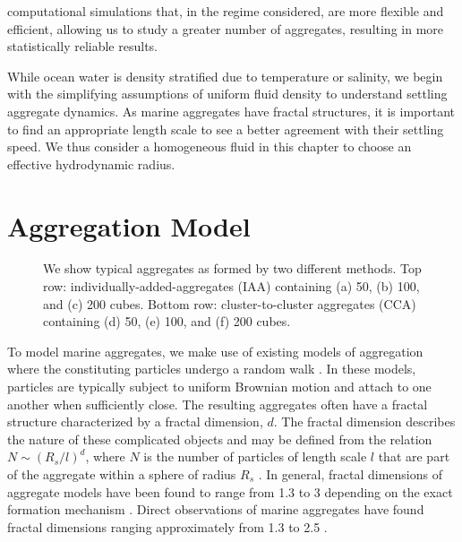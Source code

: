 computational simulations that, in the regime considered, are more flexible and efficient, allowing us to study a greater number of aggregates, resulting in more statistically reliable results. 
\par
While ocean water is density stratified due to temperature or salinity, we begin with the simplifying assumptions of uniform fluid density to understand settling aggregate dynamics. 
As marine aggregates have fractal structures, it is important to find an appropriate length scale to see a better agreement with their settling speed. We thus consider a homogeneous fluid in this chapter to choose an effective hydrodynamic radius. 



\section{Aggregation Model}
\label{sec_model}

\begin{figure}[ht]
\begin{center}
\end{center}
\caption{We show typical aggregates as formed by two different methods. Top row: individually-added-aggregates (IAA) containing (a) 50, (b) 100, and (c) 200 cubes. Bottom row: cluster-to-cluster aggregates (CCA) containing (d) 50, (e) 100, and (f) 200 cubes.}
\label{fig_rad_mass}
\end{figure}

To model marine aggregates, we make use of existing models of aggregation where the constituting particles undergo a random walk
\cite{rosenstock_cluster_1980, witten_diffusion-limited_1981,witten_tenuous_1986,kolb_anisotropic_1987}. 
In these models, particles are typically subject to uniform Brownian motion and attach to one another when 
sufficiently close. The resulting aggregates often have a fractal structure characterized by a fractal dimension, $d$. The fractal dimension describes the nature of these complicated objects and may be defined from the relation $N\sim(R_s/l)^d$, where $N$ is the number of particles of length scale $l$ that are part of the aggregate within a sphere of radius $R_s$ \cite{witten_tenuous_1986}. In general, fractal dimensions of aggregate models have been found to range from 1.3 to 3 depending on the exact formation 
mechanism \cite{witten_diffusion-limited_1981, kolb_anisotropic_1987,gmachowski_calculation_2002}. 
Direct observations of marine aggregates have found fractal dimensions ranging approximately from 1.3 to 2.5 \cite{alldredge_situ_1988,jackson_aggregation_1998}.
   
